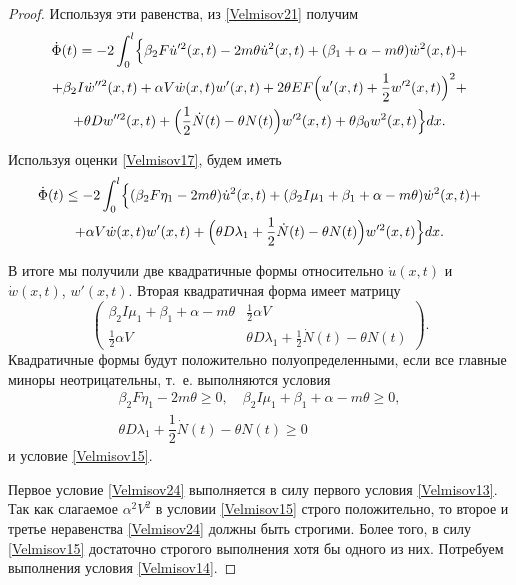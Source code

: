 \begin{proof}
Используя эти равенства, из \eqref{Velmisov21} получим
\begin{multline}
\label{Velmisov22}
\dot{\Phi }(t)=-2\int_{0}^{l}
\Bigl\{
\beta _{2}F\dot{u}'^{2} (x,t)-2m\theta \dot{u}^{2} (x,t)+(\beta _{1} +\alpha -m\theta )\dot{w}^{2} (x,t)+ 
\\
+\beta _{2}I \dot{w}''^{2} (x,t)+\alpha V\dot{w}(x,t)w'(x,t)+ 2\theta EF\Bigl(u'(x,t)+\frac{1}{2} w'^{2} (x,t)\Bigr)^{2}+ 
\\
+\theta Dw''^{2} (x,t)+\Bigl(\frac{1}{2}\dot{N}(t)-\theta N(t)\Bigr)w'^{2} (x,t)+\theta \beta _{0} w^{2} (x,t)\Bigr\}dx.
\end{multline}

Используя оценки \eqref{Velmisov17}, будем иметь
\begin{multline}
\label{Velmisov23}
\dot{\Phi }(t)\le -2\int_{0}^{l}
\Bigl\{
(\beta _{2}F\eta _{1} -2m\theta )\dot{u}^{2} (x,t)+(\beta _{2} I\mu _{1} +\beta _{1} +\alpha -m\theta)\dot{w}^{2} (x,t)+
\\  
+\alpha V\dot{w}(x,t)w'(x,t) + \Bigl(\theta D\lambda _{1}+\frac{1}{2}\dot{N}(t) -\theta N(t)\Bigr)w'^{2} (x,t)\Bigr\}dx.
\end{multline} 

В итоге мы получили две квадратичные формы относительно $\dot{u}(x,t)$ \linebreak и~$\dot{w}(x,t)$, $w'(x,t)$. Вторая квадратичная форма имеет матрицу
$$
\left(\begin{array}{cc} {\beta _{2} I\mu _{1} +\beta _{1} +\alpha -m\theta} & {\frac{1}{2}\alpha V}
 \\ {\frac{1}{2}\alpha V} & {\theta D\lambda _{1}+\frac{1}{2}\dot{N}(t) -\theta N(t) } \end{array}\right).
$$ 
Квадратичные формы будут положительно полуопределенными, если все главные миноры неотрицательны, т.~е. выполняются условия 
\begin{equation} 
\label{Velmisov24} 
\begin{array}{c}
\beta _{2}F\eta _{1} -2m\theta\ge 0, \quad \beta _{2} I\mu _{1} +\beta _{1} +\alpha -m\theta\ge 0,\\
\theta D\lambda _{1}+\dfrac{1}{2}\dot{N}(t) -\theta N(t)\ge 0
\end{array}
\end{equation}
и условие \eqref{Velmisov15}.

Первое условие \eqref{Velmisov24} выполняется в силу первого условия \eqref{Velmisov13}. Так как слагаемое $\alpha ^{2} V^{2}$ в условии \eqref{Velmisov15} строго положительно, то второе и третье неравенства \eqref{Velmisov24} должны быть строгими. Более того, в силу \eqref{Velmisov15} достаточно строгого выполнения хотя бы одного из них. Потребуем выполнения условия \eqref{Velmisov14}. 


\end{proof}

